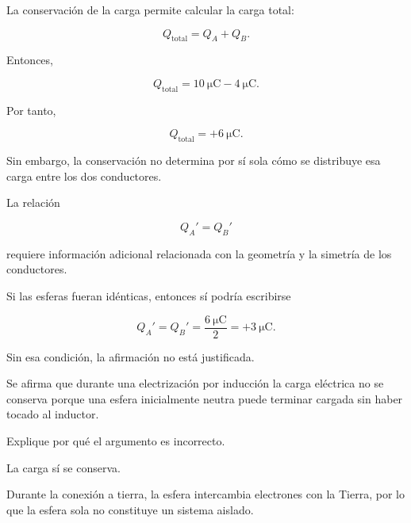 \begin{explicacion}

La conservación de la carga permite calcular la carga total:

\[
Q_{\text{total}}
=
Q_A+Q_B.
\]

Entonces,

\[
Q_{\text{total}}
=
\SI{10}{\micro\coulomb}
-\SI{4}{\micro\coulomb}.
\]

Por tanto,

\[
\boxed{
Q_{\text{total}}
=
+\SI{6}{\micro\coulomb}
}.
\]

Sin embargo, la conservación no determina por sí sola cómo se distribuye esa
carga entre los dos conductores.

La relación

\[
Q_A'=Q_B'
\]

requiere información adicional relacionada con la geometría y la simetría de
los conductores.

Si las esferas fueran idénticas, entonces sí podría escribirse

\[
Q_A'=Q_B'
=
\frac{\SI{6}{\micro\coulomb}}{2}
=
+\SI{3}{\micro\coulomb}.
\]

Sin esa condición, la afirmación no está justificada.

\end{explicacion}



\begin{ejercicio}

Se afirma que durante una electrización por inducción la carga eléctrica no
se conserva porque una esfera inicialmente neutra puede terminar cargada sin
haber tocado al inductor.

Explique por qué el argumento es incorrecto.

\end{ejercicio}

\begin{respuesta}

La carga sí se conserva.

Durante la conexión a tierra, la esfera intercambia electrones con la Tierra,
por lo que la esfera sola no constituye un sistema aislado.

\end{respuesta}

